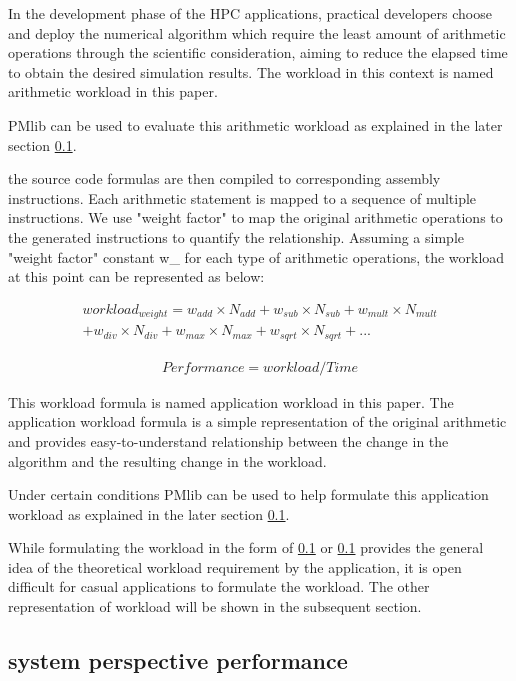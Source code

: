 \documentclass[conference]{IEEEtran}
\begin{document}
In the development phase of the HPC applications, practical developers
choose and deploy the numerical algorithm which require the least
amount of arithmetic operations through the scientific consideration,
aiming to reduce the elapsed time to obtain the desired simulation results.
The workload in this context is named arithmetic workload in this paper.

PMlib can be used to evaluate this arithmetic workload as explained
in the later section \ref{}.


the source code formulas are then compiled to corresponding assembly
instructions.
Each arithmetic statement is mapped to a sequence of multiple instructions.
We use "weight factor" to map the original arithmetic operations to the
generated instructions to quantify the relationship.
Assuming a simple "weight factor" constant w\_\* for each type of
arithmetic operations, 
the workload at this point can be represented as below:

\begin{align*}
workload_{weight} =
	w_{add}\times N_{add} + w_{sub}\times N_{sub} + w_{mult}\times N_{mult} \\
	+ w_{div}\times N_{div} + w_{max}\times N_{max} + w_{sqrt}\times N_{sqrt} + ...
\end{align*}

\begin{align*}
Performance = workload / Time 
\end{align*}

This workload formula is named application workload in this paper.
The application workload formula is a simple representation of the original
arithmetic and provides easy-to-understand relationship between the change
in the algorithm and the resulting change in the workload.

Under certain conditions
PMlib can be used to help formulate this application workload as explained
in the later section \ref{}.

While formulating the workload in the form of
\ref{}
or
\ref{}
provides the general idea of the theoretical workload requirement by the
application, it is open difficult for casual applications to formulate
the workload. The other representation of workload will be shown in
the subsequent section.

\subsection{system perspective performance}
\end{document}
